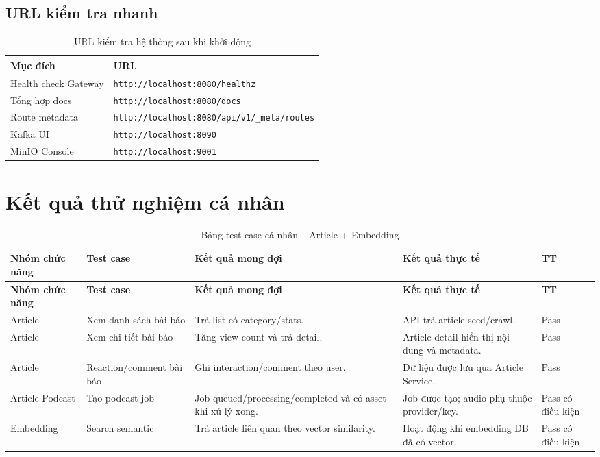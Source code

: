 \documentclass[14pt,a4paper,oneside]{extreport}
\begin{document}
\subsection{URL kiểm tra nhanh}

\begin{table}[H]
\centering
\caption{URL kiểm tra hệ thống sau khi khởi động}
\label{tab:url-kiem-tra}
\renewcommand{\arraystretch}{1.3}
\small
\begin{tabularx}{\textwidth}{|l|X|}
\hline
\textbf{Mục đích} & \textbf{URL} \\
\hline
Health check Gateway & \texttt{http://localhost:8080/healthz} \\
\hline
Tổng hợp docs & \texttt{http://localhost:8080/docs} \\
\hline
Route metadata & \texttt{http://localhost:8080/api/v1/\_meta/routes} \\
\hline
Kafka UI & \texttt{http://localhost:8090} \\
\hline
MinIO Console & \texttt{http://localhost:9001} \\
\hline
\end{tabularx}
\end{table}

\section{Kết quả thử nghiệm cá nhân}
\label{sec:ket-qua-thu-nghiem}

\begin{longtable}{|p{2.8cm}|p{4.0cm}|p{4.3cm}|p{3.0cm}|p{1.6cm}|}
\caption{Bảng test case cá nhân -- Article + Embedding}
\label{tab:test-case}\\
\hline
\textbf{Nhóm chức năng} & \textbf{Test case} & \textbf{Kết quả mong đợi} & \textbf{Kết quả thực tế} & \textbf{TT} \\
\hline
\endfirsthead
\hline
\textbf{Nhóm chức năng} & \textbf{Test case} & \textbf{Kết quả mong đợi} & \textbf{Kết quả thực tế} & \textbf{TT} \\
\hline
\endhead
Article & Xem danh sách bài báo & Trả list có category/stats. & API trả article seed/crawl. & Pass \\
\hline
Article & Xem chi tiết bài báo & Tăng view count và trả detail. & Article detail hiển thị nội dung và metadata. & Pass \\
\hline
Article & Reaction/comment bài báo & Ghi interaction/comment theo user. & Dữ liệu được lưu qua Article Service. & Pass \\
\hline
Article Podcast & Tạo podcast job & Job queued/processing/completed và có asset khi xử lý xong. & Job được tạo; audio phụ thuộc provider/key. & Pass có điều kiện \\
\hline
Embedding & Search semantic & Trả article liên quan theo vector similarity. & Hoạt động khi embedding DB đã có vector. & Pass có điều kiện \\
\hline
\end{longtable}
\end{document}
